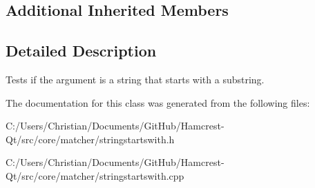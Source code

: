 \subsection*{Additional Inherited Members}


\subsection{Detailed Description}
Tests if the argument is a string that starts with a substring. 

The documentation for this class was generated from the following files\-:\begin{DoxyCompactItemize}
\item 
C\-:/\-Users/\-Christian/\-Documents/\-Git\-Hub/\-Hamcrest-\/\-Qt/src/core/matcher/stringstartswith.\-h\item 
C\-:/\-Users/\-Christian/\-Documents/\-Git\-Hub/\-Hamcrest-\/\-Qt/src/core/matcher/stringstartswith.\-cpp\end{DoxyCompactItemize}
